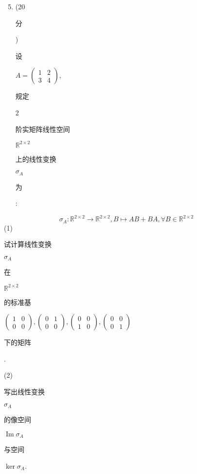 \documentclass[10pt]{article}
\begin{document}
\begin{enumerate}
  \setcounter{enumi}{4}
  \item (20 \begin{CJK}{UTF8}{mj}分\end{CJK}) \begin{CJK}{UTF8}{mj}设\end{CJK} $A=\left(\begin{array}{ll}1 & 2 \\ 3 & 4\end{array}\right)$, \begin{CJK}{UTF8}{mj}规定\end{CJK} 2 \begin{CJK}{UTF8}{mj}阶实矩阵线性空间\end{CJK} $\mathbb{R}^{2 \times 2}$ \begin{CJK}{UTF8}{mj}上的线性变换\end{CJK} $\sigma_{A}$ \begin{CJK}{UTF8}{mj}为\end{CJK}:
\end{enumerate}
$$
\sigma_{A}: \mathbb{R}^{2 \times 2} \rightarrow \mathbb{R}^{2 \times 2}, B \mapsto A B+B A, \forall B \in \mathbb{R}^{2 \times 2}
$$
(1) \begin{CJK}{UTF8}{mj}试计算线性变换\end{CJK} $\sigma_{A}$ \begin{CJK}{UTF8}{mj}在\end{CJK} $\mathbb{R}^{2 \times 2}$ \begin{CJK}{UTF8}{mj}的标准基\end{CJK} $\left(\begin{array}{ll}1 & 0 \\ 0 & 0\end{array}\right),\left(\begin{array}{ll}0 & 1 \\ 0 & 0\end{array}\right),\left(\begin{array}{ll}0 & 0 \\ 1 & 0\end{array}\right),\left(\begin{array}{ll}0 & 0 \\ 0 & 1\end{array}\right)$ \begin{CJK}{UTF8}{mj}下的矩阵\end{CJK}.

(2) \begin{CJK}{UTF8}{mj}写出线性变换\end{CJK} $\sigma_{A}$ \begin{CJK}{UTF8}{mj}的像空间\end{CJK} $\operatorname{Im} \sigma_{A}$ \begin{CJK}{UTF8}{mj}与空间\end{CJK} $\operatorname{ker} \sigma_{A}$.
\end{document}
